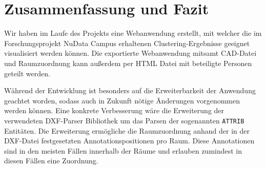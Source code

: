 \section{Zusammenfassung und Fazit}
\label{sec:summary}

Wir haben im Laufe des Projekts eine Webanwendung erstellt, mit welcher die im Forschungsprojekt \glqq{}NuData Campus\grqq{} erhaltenen Clustering-Ergebnisse geeignet visualisiert werden können.
Die exportierte Webanwendung mitsamt CAD-Datei und Raumzuordnung kann außerdem per HTML Datei mit beteiligte Personen geteilt werden.

Während der Entwicklung ist besonders auf die Erweiterbarkeit der Anwendung geachtet worden, sodass auch in Zukunft nötige Änderungen vorgenommen werden können.
Eine konkrete Verbesserung wäre die Erweiterung der verwendeten DXF-Parser Bibliothek um das Parsen der sogenannten \texttt{ATTRIB} Entitäten.
Die Erweiterung ermögliche die Raumzuordnung anhand der in der DXF-Datei festgesetzten Annotationspositionen pro Raum.
Diese Annotationen sind in den meisten Fällen innerhalb der Räume und erlauben zumindest in diesen Fällen eine Zuordnung.
